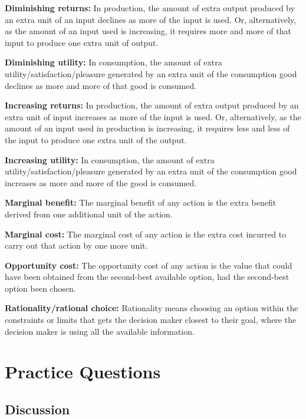 \documentclass[
]{book}
\begin{document}
\textbf{Diminishing returns:} In production, the amount of extra output produced by an extra unit of an input declines as more of the input is used. Or, alternatively, as the amount of an input used is increasing, it requires more and more of that input to produce one extra unit of output.

\textbf{Diminishing utility:} In consumption, the amount of extra utility/satisfaction/pleasure generated by an extra unit of the consumption good declines as more and more of that good is consumed.

\textbf{Increasing returns:} In production, the amount of extra output produced by an extra unit of input increases as more of the input is used. Or, alternatively, as the amount of an input used in production is increasing, it requires less and less of the input to produce one extra unit of the output.

\textbf{Increasing utility:} In consumption, the amount of extra utility/satisfaction/pleasure generated by an extra unit of the consumption good increases as more and more of the good is consumed.

\textbf{Marginal benefit:} The marginal benefit of any action is the extra benefit derived from one additional unit of the action.

\textbf{Marginal cost:} The marginal cost of any action is the extra cost incurred to carry out that action by one more unit.

\textbf{Opportunity cost:} The opportunity cost of any action is the value that could have been obtained from the second-best available option, had the second-best option been chosen.

\textbf{Rationality/rational choice:} Rationality means choosing an option within the constraints or limits that gets the decision maker closest to their goal, where the decision maker is using all the available information.

\hypertarget{practice-questions-2}{%
\section{Practice Questions}\label{practice-questions-2}}

\hypertarget{discussion-2}{%
\subsection{Discussion}\label{discussion-2}}
\end{document}

